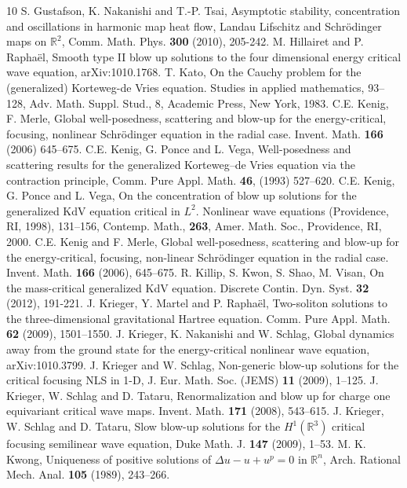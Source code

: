 \documentclass[11pt,a4paper,reqno]{amsart}
\theoremstyle{remark}
\numberwithin{equation}{section}
\def\RR{\mathbb{R}}
\def\RR{\mathbb{R}}
\begin{document}
\begin{thebibliography}{10}
 S. Gustafson,   K. Nakanishi  and    T.-P. Tsai,   Asymptotic stability, concentration and oscillations in harmonic map heat flow, Landau Lifschitz and Schr\"odinger maps on $\RR^2$, Comm. Math. Phys.  \textbf{300}  (2010), 205-242.
 M. Hillairet and   P. Rapha\"el, Smooth type II blow up solutions to the four dimensional energy critical wave equation, arXiv:1010.1768.
 T. Kato, On the Cauchy problem for the (generalized) Korteweg-de Vries equation.  Studies in applied mathematics,  93--128, Adv. Math. Suppl. Stud., 8, Academic Press, New York, 1983.
 C.E.
Kenig, F. Merle,
Global well-posedness, scattering and blow-up for the energy-critical, focusing, nonlinear Schr\"odinger equation in the radial case.  
Invent. Math. \textbf{166} (2006) 645--675.
 C.E. Kenig, G. Ponce and L. Vega, Well-posedness and scattering results for the generalized Korteweg--de Vries equation via the contraction principle, Comm. Pure Appl. Math. \textbf{46}, (1993) 527--620. 
 C.E. Kenig, G. Ponce and L. Vega, On the concentration of blow up solutions for the generalized KdV equation critical in $L^2$. Nonlinear wave equations (Providence, RI, 1998), 131--156, Contemp. Math., \textbf{263}, Amer. Math. Soc., Providence, RI, 2000.
 C.E. Kenig  and  F. Merle,  Global well-posedness, scattering and blow-up for the energy-critical, focusing, non-linear Schr\"odinger equation in the radial case. Invent. Math. \textbf{166} (2006),   645--675.
 R. Killip,  S. Kwon, S. Shao, M. Visan,  On the mass-critical generalized KdV equation. Discrete Contin. Dyn. Syst. \textbf{32} (2012),   191-221.
J. Krieger, Y.  Martel and P. Rapha\"el,  Two-soliton solutions to the three-dimensional gravitational Hartree equation. Comm. Pure Appl. Math. \textbf{62} (2009),   1501--1550.
  J. Krieger, K. Nakanishi  and  W. Schlag,  Global dynamics away from the ground state for the energy-critical nonlinear wave equation,  arXiv:1010.3799.
 J. Krieger and W. Schlag, Non-generic blow-up solutions for the critical focusing NLS in 1-D, J. 
Eur. Math. Soc. (JEMS) \textbf{11} (2009),  1--125.
 J. Krieger, W.  Schlag and  D. Tataru,  Renormalization and blow up for charge one equivariant critical wave maps. Invent. Math. \textbf{171} (2008),   543--615.
 J. Krieger, W.  Schlag and  D. Tataru,   Slow blow-up solutions for the $H^1(\RR^3)$ critical focusing semilinear wave equation, Duke Math. J. \textbf{147} (2009), 1--53.
 M. K. Kwong, Uniqueness of positive solutions of $\Delta u - u + u^p=0$ in $\RR^n$, Arch. Rational Mech. Anal. \textbf{105} (1989), 243--266.

\end{thebibliography}
\end{document}
